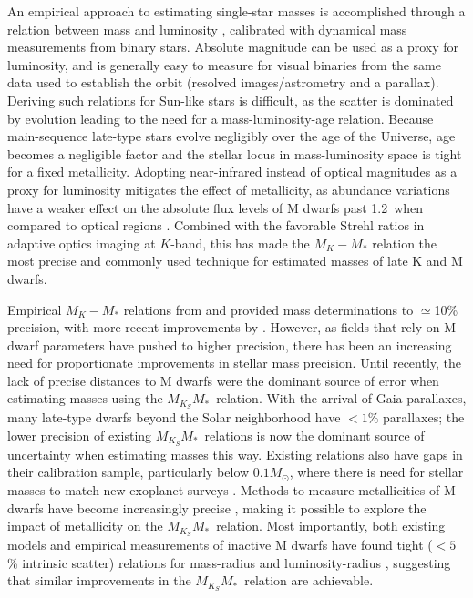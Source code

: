 \documentclass[twocolumn]{aastex62}
\newcommand{\mmk}{$M_{K_S}$\textendash$M_*$}
\begin{document}
An empirical approach to estimating single-star masses is accomplished through a relation between mass and luminosity \citep[e.g.,][]{Hen1993, Delfosse2000}, calibrated with dynamical mass measurements from binary stars. Absolute magnitude can be used as a proxy for luminosity, and is generally easy to measure for visual binaries from the same data used to establish the orbit (resolved images/astrometry and a parallax). Deriving such relations for Sun-like stars is difficult, as the scatter is dominated by evolution \citep[e.g.,][]{1991A&ARv...3...91A,2010A&ARv..18...67T} leading to the need for a mass-luminosity-age relation. Because main-sequence late-type stars evolve negligibly over the age of the Universe, age becomes a negligible factor and the stellar locus in mass-luminosity space is tight for a fixed metallicity. Adopting near-infrared instead of optical magnitudes as a proxy for luminosity mitigates the effect of metallicity, as abundance variations have a weaker effect on the absolute flux levels of M dwarfs past 1.2\um\ when compared to optical regions \citep{Delfosse2000,Bonfils:2005}. Combined with the favorable Strehl ratios in adaptive optics imaging at $K$-band, this has made the $M_K-M_*$ relation the most precise and commonly used technique for estimated masses of late K and M dwarfs. 

Empirical $M_K-M_*$ relations from \citet{Hen1993} and \citet{Delfosse2000} provided mass determinations to $\simeq$10\% precision, with more recent improvements by \citet{Benedict2016}. However, as fields that rely on M dwarf parameters have pushed to higher precision, there has been an increasing need for proportionate improvements in stellar mass precision. Until recently, the lack of precise distances to M dwarfs were the dominant source of error when estimating masses using the \mmk\ relation. With the arrival of Gaia parallaxes, many late-type dwarfs beyond the Solar neighborhood have $<1\%$ parallaxes; the lower precision of existing \mmk\ relations is now the dominant source of uncertainty when estimating masses this way. Existing relations also have gaps in their calibration sample, particularly below $0.1M_\odot$, where there is need for stellar masses to match new exoplanet surveys \citep[e.g.,][]{Gillon2017}. Methods to measure metallicities of M dwarfs have become increasingly precise \citep[e.g.,][]{RojasAyala:2010, 2014A&A...568A.121N}, making it possible to explore the impact of metallicity on the \mmk\ relation. Most importantly, both existing models and empirical measurements of inactive M dwarfs have found tight ($<5$\% intrinsic scatter) relations for mass-radius \citep[e.g.,][]{Bayless2006,Spada2013,2017AJ....154..100H} and luminosity-radius \citep[e.g.,][]{Boyajian2012,2015ApJ...802L..10T,Mann2015b}, suggesting that similar improvements in the \mmk\ relation are achievable. 
\end{document}
